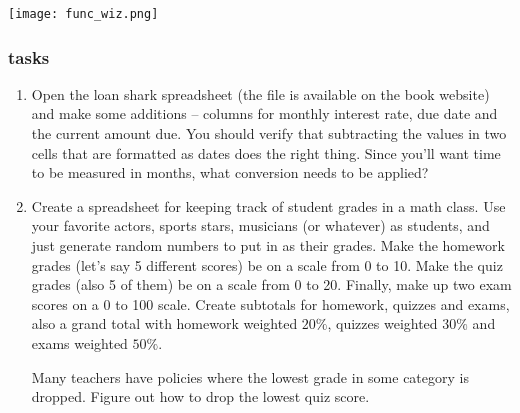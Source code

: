\centerline{\texttt{[image: func\_wiz.png]}}

\subsubsection{tasks}

\begin{enumerate}

\item Open the loan shark spreadsheet (the file is available on the book website) and make some additions -- columns for monthly interest rate, due date and the current amount due.  You should verify that subtracting the values in two cells that are formatted as dates does the right thing.  Since you'll want time to be measured in months, what conversion needs to be applied?

\item Create a spreadsheet for keeping track of student grades in a math class. Use your favorite actors, sports stars, musicians (or whatever) as students, and just generate random numbers to put in as their grades. Make the homework grades (let's say 5 different scores) be on a scale from 0 to 10.  Make the quiz grades (also 5 of them) be on a scale from 0 to 20. Finally, make up two exam scores on a 0 to 100 scale.
Create subtotals for homework, quizzes and exams, also a grand total with homework weighted $20\%$, quizzes weighted
$30\%$ and exams weighted $50\%$.  

Many teachers have policies where the lowest grade in some category is dropped.  Figure out how to drop the lowest quiz score.

\end{enumerate}

